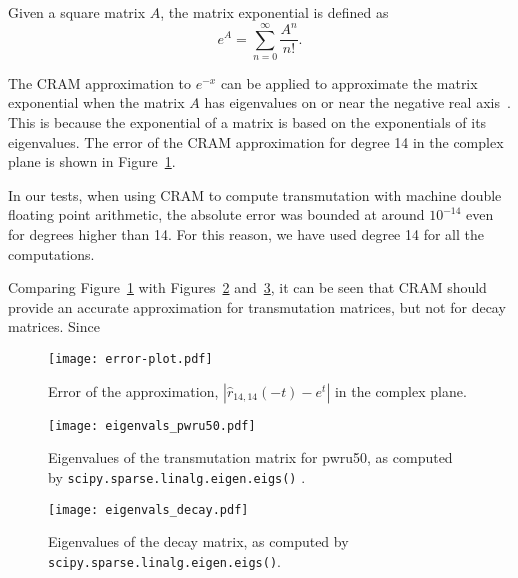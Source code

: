 Given a square matrix $A$, the matrix exponential is defined
as~\cite{ationneeded}
\begin{equation}
  \label{eq:matrix-exponential}
  e^{A} = \sum_{n=0}^\infty \frac{A^n}{n!}.
\end{equation}

The CRAM approximation to $e^{-x}$ can be applied to approximate the matrix
exponential when the matrix $A$ has eigenvalues on or near the negative real
axis~\cite{pusa2010computing}. This is because the exponential of a matrix is based on the exponentials of
its eigenvalues. The error of the CRAM approximation for degree 14 in the
complex plane is shown in Figure~\ref{fig:error-plot}.

In our tests, when using CRAM to compute transmutation with machine double
floating point arithmetic, the absolute error was bounded at around
$10^{-14}$ even for degrees higher than 14. For this reason, we have used
degree 14 for all the computations. 

Comparing Figure~\ref{fig:error-plot} with Figures~\ref{fig:eigenvals-pwru50}
and~\ref{fig:eigenvals-decay}, it can be seen that CRAM should provide an
accurate approximation for transmutation matrices, but not for decay matrices.
Since


\begin{figure}[!ht]
\centering
\texttt{[image: error-plot.pdf]}
\caption{Error of the approximation, $\left |\hat{r}_{14,14}(-t) - e^{t}\right
  |$ in the complex plane. }
\label{fig:error-plot}
\end{figure}

\begin{figure}[!ht]
\centering
\texttt{[image: eigenvals\_pwru50.pdf]}
\caption{Eigenvalues of the transmutation matrix for pwru50, as computed by
  \texttt{scipy.\allowbreak{}sparse.\allowbreak{}linalg.\allowbreak{}eigen.\allowbreak{}eigs()}
  .}
\label{fig:eigenvals-pwru50}
\end{figure}

\begin{figure}[!ht]
\centering
\texttt{[image: eigenvals\_decay.pdf]}
\caption{Eigenvalues of the decay matrix, as computed by
  \texttt{scipy.\allowbreak{}sparse.\allowbreak{}linalg.\allowbreak{}eigen.\allowbreak{}eigs()}.}
\label{fig:eigenvals-decay}
\end{figure}

